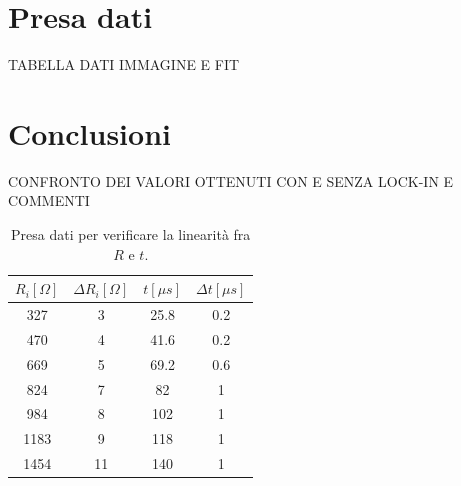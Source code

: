 \documentclass[10pt,a4paper]{article}
\begin{document}
\section{Presa dati}

TABELLA DATI
IMMAGINE E FIT




\section{Conclusioni}

CONFRONTO DEI VALORI OTTENUTI CON E SENZA LOCK-IN E COMMENTI


\begin{table}[!htb]
\centering
\begin{tabular}{|c|c|c|c|}
\hline 
$R_i [\Omega ]$ & $\Delta R_i [\Omega ]$ & $t [\mu s]$ & $\Delta t [\mu s]$\\
\hline
 327 &  3 & 25.8 & 0.2\\ 
\hline 
 470 &  4 & 41.6 & 0.2\\ 
\hline
 669 &  5 & 69.2 & 0.6\\ 
\hline
 824 &  7 & 82 & 1\\ 
\hline 
 984 &  8 & 102 & 1\\ 
\hline
 1183 &  9 & 118 & 1\\ 
\hline
 1454 &  11 & 140 & 1\\ 
\hline
\end{tabular} 
\caption{Presa dati per verificare la linearità fra $R$ e $t$.\label{tab:monostabile}}
\end{table}
\end{document}

